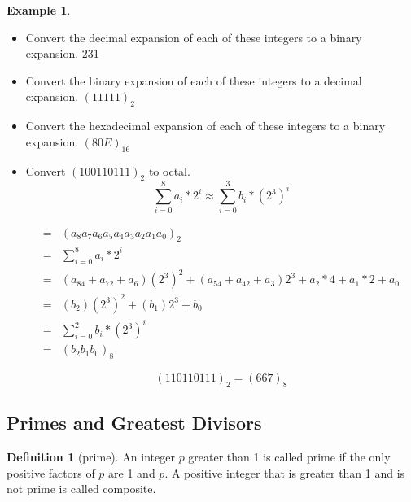 \documentclass[letterpaper,10pt]{article}
\theoremstyle{plain}
\theoremstyle{definition}
\newtheorem{defn}[thm]{Definition}
\newtheorem{exmp}[thm]{Example}
\theoremstyle{remark}
\begin{document}
\begin{exmp} $ $\\

\begin{itemize}
\item Convert the decimal expansion of each of these integers to a binary expansion. 231

\vspace{2cm}

\item  Convert the binary expansion of each of these integers to a decimal expansion.
 $(1 1111)_2$
 \vspace{2cm}

 \item Convert the hexadecimal expansion of each of these integers
to a binary expansion. $(80E)_{16}$

\newpage
\item Convert $(100110111)_2$ to octal.
\newline
\[\sum_{i=0}^8 a_i*2^i\approx \sum_{i=0}^3 b_i*(2^3)^i \]

\begin{align}
=&(a_8a_7a_6a_5a_4a_3a_2a_1a_0)_2\\
=&\sum_{i=0}^8a_i*2^i\\
=&(a_84+a_72+a_6)(2^3)^2+(a_54+a_42+a_3)2^3+a_2*4+a_1*2+a_0\\
=&(b_2)(2^3)^2+(b_1)2^3+b_0\\
=&\sum_{i=0}^2 b_i*(2^3)^i\\
=&(b_2b_1b_0)_{8}
\end{align}

\[(110110111)_2=(667)_{8}\]


\end{itemize}

\end{exmp}

\newpage
\subsection{Primes and Greatest Divisors}
\begin{defn}[prime]
An integer $p$ greater than 1 is called prime if the only positive factors of $p$ are 1 and $p$.
A positive integer that is greater than 1 and is not prime is called composite.
\end{defn}
\end{document}
